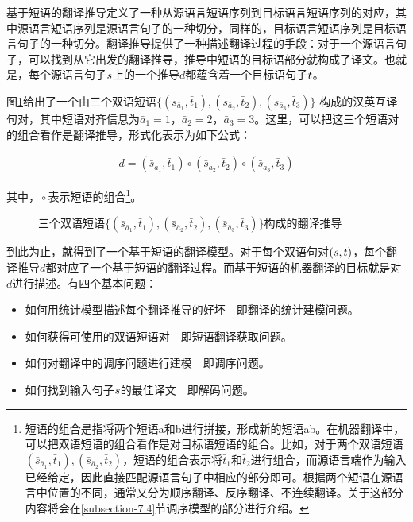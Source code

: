 \parinterval 基于短语的翻译推导定义了一种从源语言短语序列到目标语言短语序列的对应，其中源语言短语序列是源语言句子的一种切分，同样的，目标语言短语序列是目标语言句子的一种切分。翻译推导提供了一种描述翻译过程的手段：对于一个源语言句子，可以找到从它出发的翻译推导，推导中短语的目标语部分就构成了译文。也就是，每个源语言句子${s}$上的一个推导$d$都蕴含着一个目标语句子${t}$。

\parinterval 图\ref{fig:7-10}给出了一个由三个双语短语$\{(\bar{s}_{\bar{a}_1},\bar{t}_1),(\bar{s}_{\bar{a}_2},\bar{t}_2),(\bar{s}_{\bar{a}_3},\bar{t}_3)\}$ 构成的汉英互译句对，其中短语对齐信息为$\bar{a}_1 = 1$，$\bar{a}_2 = 2$，$\bar{a}_3 = 3$。这里，可以把这三个短语对的组合看作是翻译推导，形式化表示为如下公式：

\begin{eqnarray}
d = {(\bar{s}_{\bar{a}_1},\bar{t}_1)} \circ {(\bar{s}_{\bar{a}_2},\bar{t}_2)} \circ {(\bar{s}_{\bar{a}_3},\bar{t}_3)}
\label{eq:7-1}
\end{eqnarray}

\noindent 其中，${} \circ $表示短语的组合\footnote[2]{短语的组合是指将两个短语a和b进行拼接，形成新的短语ab。在机器翻译中，可以把双语短语的组合看作是对目标语短语的组合。比如，对于两个双语短语$(\bar{s}_{\bar{a}_1},\bar{t}_1),(\bar{s}_{\bar{a}_2},\bar{t}_2)$，短语的组合表示将$\bar{t}_1$和$\bar{t}_2$进行组合，而源语言端作为输入已经给定，因此直接匹配源语言句子中相应的部分即可。根据两个短语在源语言中位置的不同，通常又分为顺序翻译、反序翻译、不连续翻译。关于这部分内容将会在\ref{subsection-7.4}节调序模型的部分进行介绍。}。

\begin{figure}[htp]
\centering

\caption{三个双语短语$\{(\bar{s}_{\bar{a}_1},\bar{t}_1),(\bar{s}_{\bar{a}_2},\bar{t}_2),(\bar{s}_{\bar{a}_3},\bar{t}_3)\}$构成的翻译推导}
\label{fig:7-10}
\end{figure}

\parinterval 到此为止，就得到了一个基于短语的翻译模型。对于每个双语句对$({s}, {t})$，每个翻译推导$d$都对应了一个基于短语的翻译过程。而基于短语的机器翻译的目标就是对$d$进行描述。有四个基本问题：

\begin{itemize}
\vspace{0.5em}
\item 如何用统计模型描述每个翻译推导的好坏\ \dash \ 即翻译的统计建模问题。
\vspace{0.5em}
\item 如何获得可使用的双语短语对\ \dash \ 即短语翻译获取问题。
\vspace{0.5em}
\item 如何对翻译中的调序问题进行建模\ \dash \ 即调序问题。
\vspace{0.5em}
\item 如何找到输入句子${s}$的最佳译文\ \dash \ 即解码问题。
\vspace{0.5em}
\end{itemize}

